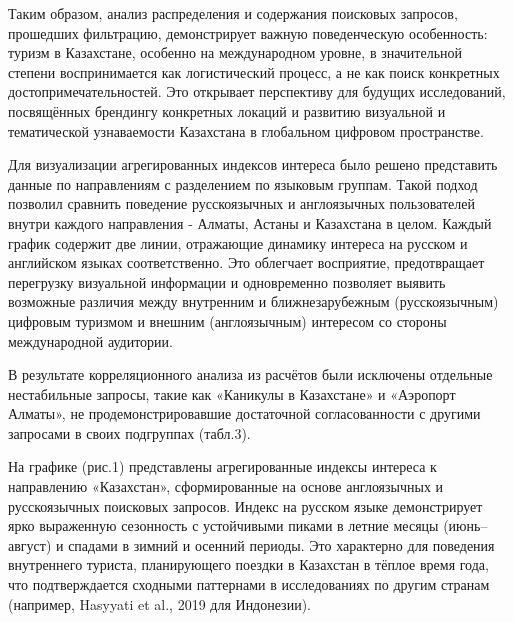 \begin{multicols}{2}
Таким образом, анализ распределения и содержания поисковых запросов,
прошедших фильтрацию, демонстрирует важную поведенческую особенность:
туризм в Казахстане, особенно на международном уровне, в значительной
степени воспринимается как логистический процесс, а не как поиск
конкретных достопримечательностей. Это открывает перспективу для будущих
исследований, посвящённых брендингу конкретных локаций и развитию
визуальной и тематической узнаваемости Казахстана в глобальном цифровом
пространстве.

Для визуализации агрегированных индексов интереса было решено
представить данные по направлениям с разделением по языковым группам.
Такой подход позволил сравнить поведение русскоязычных и англоязычных
пользователей внутри каждого направления - Алматы, Астаны и Казахстана в
целом. Каждый график содержит две линии, отражающие динамику интереса на
русском и английском языках соответственно. Это облегчает восприятие,
предотвращает перегрузку визуальной информации и одновременно позволяет
выявить возможные различия между внутренним и ближнезарубежным
(русскоязычным) цифровым туризмом и внешним (англоязычным) интересом со
стороны международной аудитории.

В результате корреляционного анализа из расчётов были исключены
отдельные нестабильные запросы, такие как «Каникулы в Казахстане» и
«Аэропорт Алматы», не продемонстрировавшие достаточной согласованности с
другими запросами в своих подгруппах (табл.3).

На графике (рис.1) представлены агрегированные индексы интереса к
направлению «Казахстан», сформированные на основе англоязычных и
русскоязычных поисковых запросов. Индекс на русском языке демонстрирует
ярко выраженную сезонность с устойчивыми пиками в летние месяцы
(июнь--август) и спадами в зимний и осенний периоды. Это характерно для
поведения внутреннего туриста, планирующего поездки в Казахстан в тёплое
время года, что подтверждается сходными паттернами в исследованиях по
другим странам (например, Hasyyati et al., 2019 для Индонезии).
\end{multicols}

